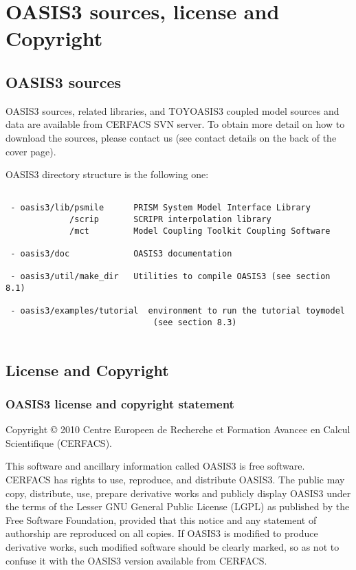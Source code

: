 \newpage
\chapter{OASIS3 sources, license and Copyright}
\label{sec_Obtaining}
%
\section{OASIS3 sources}
OASIS3 sources, related libraries, and TOYOASIS3
coupled model sources and data are available from CERFACS SVN server. To obtain more detail on how to download
the sources, please
contact us (see contact details on the back of the cover page).

OASIS3 directory structure is the following one:

\begin{verbatim}

 - oasis3/lib/psmile      PRISM System Model Interface Library
             /scrip       SCRIPR interpolation library
             /mct         Model Coupling Toolkit Coupling Software
                  
 - oasis3/doc             OASIS3 documentation
 
 - oasis3/util/make_dir   Utilities to compile OASIS3 (see section 8.1) 

 - oasis3/examples/tutorial  environment to run the tutorial toymodel
                              (see section 8.3)
 
\end{verbatim}
%                              
% 
%

\section{License and Copyright}

\subsection{OASIS3 license and copyright statement}

Copyright © 2010 Centre Europeen de Recherche et Formation
Avancee en Calcul Scientifique (CERFACS).  

This software and ancillary information called OASIS3 is free
software.  CERFACS has rights to use, reproduce, and distribute
OASIS3. The public may copy, distribute, use, prepare derivative works and
publicly display OASIS3 under the terms of the Lesser GNU General
Public License (LGPL) as published by the Free Software Foundation,
provided that this notice and any statement of authorship are
reproduced on all copies. If OASIS3 is modified to produce derivative
works, such modified software should be clearly marked, so as not to
confuse it with the OASIS3 version available from CERFACS.

